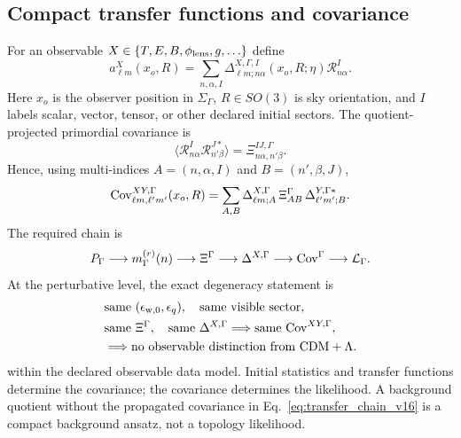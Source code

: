 \documentclass[
  aps,
  prd,
  reprint,
  superscriptaddress,
  floatfix,
  nofootinbib,
  longbibliography
]{revtex4-2}
\theoremstyle{plain}
\theoremstyle{definition}
\theoremstyle{remark}
\newcommand{\wind}{\mathrm w}
\newcommand{\eps}{\epsilon}
\newcommand{\PG}{P_\Gamma}
\begin{document}
\subsection{Compact transfer functions and covariance}

For an observable $X\in\{T,E,B,\phi_{\rm lens},g,\ldots\}$ define
\begin{equation}
a^X_{\ell m}(x_o,R)=
\sum_{n,\alpha,I}
\Delta^{X,\Gamma,I}_{\ell m;n\alpha}(x_o,R;\eta)
\mathcal R^I_{n\alpha} .
\end{equation}
Here $x_o$ is the observer position in $\Sigma_\Gamma$, $R\in SO(3)$ is sky
orientation, and $I$ labels scalar, vector, tensor, or other declared initial
sectors.  The quotient-projected primordial covariance is
\begin{equation}
\langle \mathcal R^I_{n\alpha}\mathcal R^{J*}_{n'\beta}\rangle
=
\Xi^{IJ,\Gamma}_{n\alpha,n'\beta} .
\end{equation}
Hence, using multi-indices $A=(n,\alpha,I)$ and $B=(n',\beta,J)$,
\begin{equation}
{\rm Cov}^{XY,\Gamma}_{\ell m,\ell' m'}(x_o,R)
=
\sum_{A,B}
\Delta^{X,\Gamma}_{\ell m;A}\,
\Xi^{\Gamma}_{AB}\,
\Delta^{Y,\Gamma*}_{\ell' m';B} .
\label{eq:compact_covariance_v16}
\end{equation}
The required chain is
\begin{equation}
\PG\longrightarrow
m_\Gamma^{(r)}(n)\longrightarrow
\Xi^\Gamma\longrightarrow
\Delta^{X,\Gamma}\longrightarrow
{\rm Cov}^\Gamma\longrightarrow
\mathcal L_\Gamma .
\label{eq:transfer_chain_v16}
\end{equation}
At the perturbative level, the exact degeneracy statement is
\begin{equation}
\begin{aligned}
&\text{same }(\eps_{\wind,0},\eps_q),
\quad \text{same visible sector},\\
&\text{same }\Xi^\Gamma,
\quad \text{same }\Delta^{X,\Gamma}
\Longrightarrow
\text{same }{\rm Cov}^{XY,\Gamma},\\
&\Longrightarrow
\text{no observable distinction from CDM}+\Lambda .
\end{aligned}
\label{eq:perturbative_degeneracy_v23}
\end{equation}
within the declared observable data model.  Initial statistics and transfer
functions determine the covariance; the covariance determines the likelihood.  A
background quotient without the propagated covariance in Eq.~\eqref{eq:transfer_chain_v16}
is a compact background ansatz, not a topology likelihood.
\end{document}
